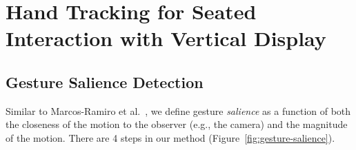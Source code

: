 % 
% 

\section{Hand Tracking for Seated Interaction with Vertical Display}
\subsection{Gesture Salience Detection}
Similar to Marcos-Ramiro et al.~\cite{marcos2013}, we define gesture
\textit{salience} as a function of both the closeness of the motion to the
observer (e.g., the camera) and the magnitude of the motion.
There are 4 steps in our method (Figure~\ref{fig:gesture-salience}).

